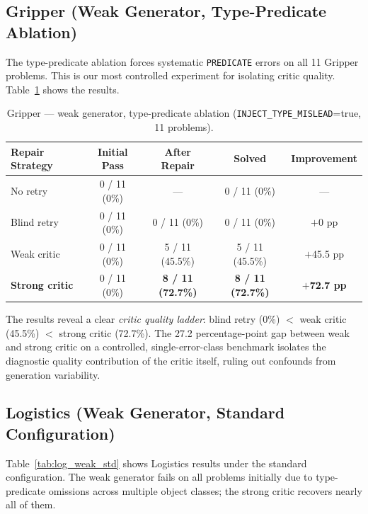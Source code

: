 \documentclass{article}
\begin{document}
\subsection{Gripper (Weak Generator, Type-Predicate Ablation)}
\label{sec:gr_weak_mislead}

The type-predicate ablation forces systematic \texttt{PREDICATE} errors on all 11
Gripper problems.  This is our most controlled experiment for isolating critic quality.
Table~\ref{tab:gr_weak_mislead} shows the results.

\begin{table}[h]
\centering
\caption{Gripper --- weak generator, type-predicate ablation (\texttt{INJECT\_TYPE\_MISLEAD}=true, 11 problems).}
\label{tab:gr_weak_mislead}
\begin{tabular}{lcccc}
\toprule
\textbf{Repair Strategy} & \textbf{Initial Pass} & \textbf{After Repair} & \textbf{Solved} & \textbf{Improvement} \\
\midrule
No retry          & 0 / 11 (0\%)  & ---            & 0 / 11 (0\%)   & ---         \\
Blind retry       & 0 / 11 (0\%)  & 0 / 11 (0\%)   & 0 / 11 (0\%)   & $+$0 pp     \\
Weak critic       & 0 / 11 (0\%)  & 5 / 11 (45.5\%) & 5 / 11 (45.5\%) & $+$45.5 pp \\
\textbf{Strong critic} & 0 / 11 (0\%) & \textbf{8 / 11 (72.7\%)} & \textbf{8 / 11 (72.7\%)} & $+$\textbf{72.7 pp} \\
\bottomrule
\end{tabular}
\end{table}

The results reveal a clear \emph{critic quality ladder}: blind retry (0\%) $<$ weak
critic (45.5\%) $<$ strong critic (72.7\%).  The 27.2 percentage-point gap between
weak and strong critic on a controlled, single-error-class benchmark isolates the
diagnostic quality contribution of the critic itself, ruling out confounds from
generation variability.

\subsection{Logistics (Weak Generator, Standard Configuration)}
\label{sec:log_weak_std}

Table~\ref{tab:log_weak_std} shows Logistics results under the standard configuration.
The weak generator fails on all problems initially due to type-predicate omissions
across multiple object classes; the strong critic recovers nearly all of them.
\end{document}
